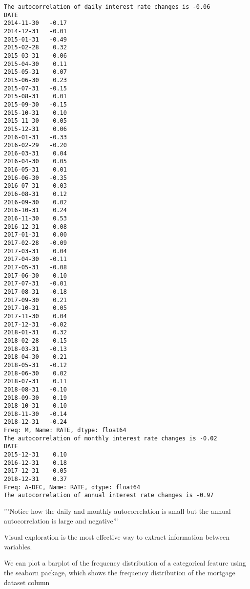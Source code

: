 \documentclass[11pt]{article}
\begin{document}
    \begin{Verbatim}[commandchars=\\\{\}]
The autocorrelation of daily interest rate changes is -0.06
DATE
2014-11-30   -0.17
2014-12-31   -0.01
2015-01-31   -0.49
2015-02-28    0.32
2015-03-31   -0.06
2015-04-30    0.11
2015-05-31    0.07
2015-06-30    0.23
2015-07-31   -0.15
2015-08-31    0.01
2015-09-30   -0.15
2015-10-31    0.10
2015-11-30    0.05
2015-12-31    0.06
2016-01-31   -0.33
2016-02-29   -0.20
2016-03-31    0.04
2016-04-30    0.05
2016-05-31    0.01
2016-06-30   -0.35
2016-07-31   -0.03
2016-08-31    0.12
2016-09-30    0.02
2016-10-31    0.24
2016-11-30    0.53
2016-12-31    0.08
2017-01-31    0.00
2017-02-28   -0.09
2017-03-31    0.04
2017-04-30   -0.11
2017-05-31   -0.08
2017-06-30    0.10
2017-07-31   -0.01
2017-08-31   -0.18
2017-09-30    0.21
2017-10-31    0.05
2017-11-30    0.04
2017-12-31   -0.02
2018-01-31    0.32
2018-02-28    0.15
2018-03-31   -0.13
2018-04-30    0.21
2018-05-31   -0.12
2018-06-30    0.02
2018-07-31    0.11
2018-08-31   -0.10
2018-09-30    0.19
2018-10-31    0.10
2018-11-30   -0.14
2018-12-31   -0.24
Freq: M, Name: RATE, dtype: float64
The autocorrelation of monthly interest rate changes is -0.02
DATE
2015-12-31    0.10
2016-12-31    0.18
2017-12-31   -0.05
2018-12-31    0.37
Freq: A-DEC, Name: RATE, dtype: float64
The autocorrelation of annual interest rate changes is -0.97

    \end{Verbatim}

    '''Notice how the daily and monthly autocorrelation is small but the
annual autocorrelation is large and negative'''

    Visual exploration is the most effective way to extract information
between variables.

We can plot a barplot of the frequency distribution of a categorical
feature using the seaborn package, which shows the frequency
distribution of the mortgage dataset column
\end{document}
